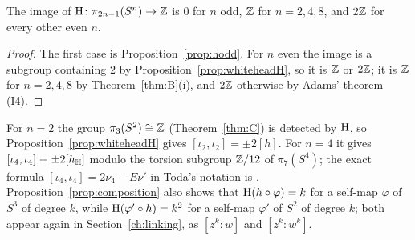\begin{corollary}\label{cor:image}
The image of $\mathrm{H}\colon\pi_{2n-1}(S^n)\to\mathbb{Z}$ is $0$ for $n$ odd, $\mathbb{Z}$ for $n=2,4,8$, and $2\mathbb{Z}$ for every other even $n$.
\end{corollary}

\begin{proof}
The first case is Proposition~\ref{prop:hodd}. For $n$ even the image is a subgroup containing $2$ by Proposition~\ref{prop:whiteheadH}, so it is $\mathbb{Z}$ or $2\mathbb{Z}$; it is $\mathbb{Z}$ for $n=2,4,8$ by Theorem~\ref{thm:B}(i), and $2\mathbb{Z}$ otherwise by Adams' theorem (I4).
\end{proof}

\begin{remark}\label{rem:whitehead-hopf}
For $n=2$ the group $\pi_3(S^2)\cong\mathbb{Z}$ (Theorem~\ref{thm:C}) is detected by $\mathrm{H}$, so Proposition~\ref{prop:whiteheadH} gives $[\iota_2,\iota_2]=\pm2[h]$. For $n=4$ it gives $[\iota_4,\iota_4]\equiv\pm2[h_{\mathbb{H}}]$ modulo the torsion subgroup $\mathbb{Z}/12$ of $\pi_7(S^4)$; the exact formula $[\iota_4,\iota_4]=2\nu_4-E\nu'$ in Toda's notation is \cite[Chapter~V]{Tod62}. Proposition~\ref{prop:composition} also shows that $\mathrm{H}(h\circ\varphi)=k$ for a self-map $\varphi$ of $S^3$ of degree $k$, while $\mathrm{H}(\varphi'\circ h)=k^2$ for a self-map $\varphi'$ of $S^2$ of degree $k$; both appear again in Section~\ref{ch:linking}, as $[z^k:w]$ and $[z^k:w^k]$.
\end{remark}

